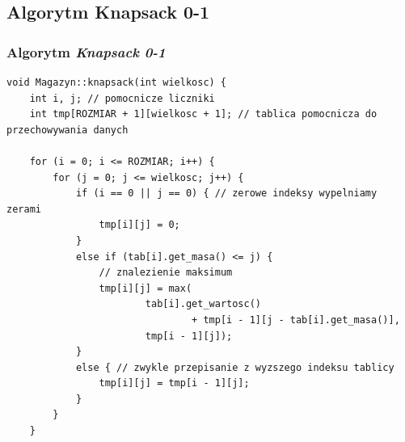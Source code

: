 \documentclass{beamer}
\begin{document}
\subsection{Algorytm Knapsack 0-1}
\begin{frame}[fragile]
	\frametitle{Algorytm \textit{Knapsack 0-1}}
	\begin{lstlisting}[basicstyle=\tiny,tabsize=2]
void Magazyn::knapsack(int wielkosc) {
	int i, j; // pomocnicze liczniki
	int tmp[ROZMIAR + 1][wielkosc + 1]; // tablica pomocnicza do przechowywania danych

	for (i = 0; i <= ROZMIAR; i++) {
		for (j = 0; j <= wielkosc; j++) {
			if (i == 0 || j == 0) { // zerowe indeksy wypelniamy zerami
				tmp[i][j] = 0;
			}
			else if (tab[i].get_masa() <= j) {
				// znalezienie maksimum
				tmp[i][j] = max(
						tab[i].get_wartosc()
								+ tmp[i - 1][j - tab[i].get_masa()],
						tmp[i - 1][j]);
			}
			else { // zwykle przepisanie z wyzszego indeksu tablicy
				tmp[i][j] = tmp[i - 1][j];
			}
		}
	}
	\end{lstlisting}
\end{frame}
\end{document}
